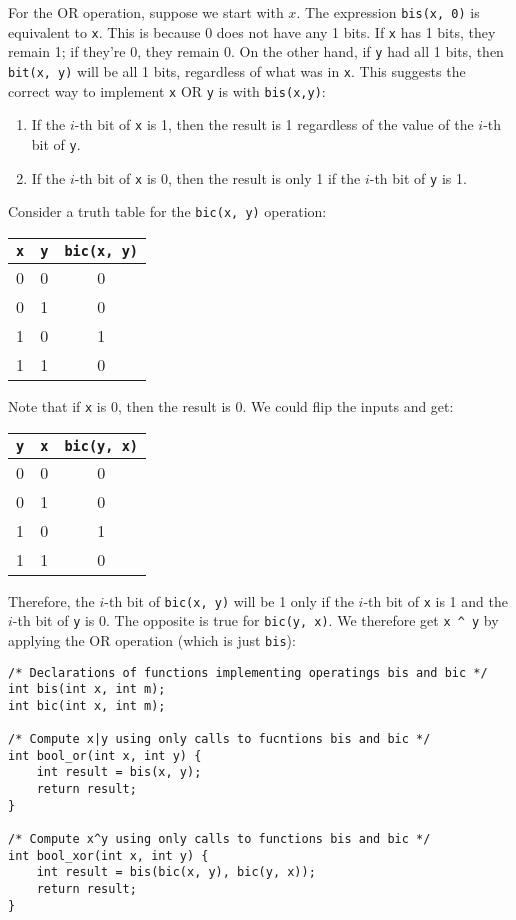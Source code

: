 \documentclass[12pt]{article}
\newenvironment{sol}[1][Solution]{\begin{trivlist}
		\item[\hskip \labelsep {\bfseries #1:}]}{\end{trivlist}}
\begin{document}
\begin{sol}
	For the OR operation, suppose we start with $x$. The expression \texttt{bis(x, 0)} is
	equivalent to \texttt{x}. This is because 0 does not have any 1 bits. If \texttt{x} has
	1 bits, they remain 1; if they're 0, they remain 0. On the other hand, if
	\texttt{y} had all 1 bits, then \texttt{bit(x, y)} will be all 1 bits, regardless of what
	was in \texttt{x}. This suggests the correct way to implement \texttt{x} OR \texttt{y}
	is with \texttt{bis(x,y)}:
	\begin{enumerate}
		\item If the $i$-th bit of \texttt{x} is 1, then the result is 1 regardless
		of the value of the $i$-th bit of \texttt{y}.
		\item  If the $i$-th bit of \texttt{x} is 0, then the result is only 1 if the
		$i$-th bit of \texttt{y} is 1.
	\end{enumerate}
	Consider a truth table for the \texttt{bic(x, y)} operation:
	\begin{center}
		\begin{tabular}{cc|c}
			\texttt{x} & \texttt{y} & \texttt{bic(x, y)}\\
			\hline
			0 & 0 & 0 \\
			0 & 1 & 0 \\
			1 & 0 & 1 \\
			1 & 1 & 0 
		\end{tabular}
	\end{center}
	Note that if \texttt{x} is 0, then the result is 0. We could flip the inputs and get:
	\begin{center}
		\begin{tabular}{cc|c}
			\texttt{y} & \texttt{x} & \texttt{bic(y, x)}\\
			\hline
			0 & 0 & 0 \\
			0 & 1 & 0 \\
			1 & 0 & 1 \\
			1 & 1 & 0 
		\end{tabular}
	\end{center}
	Therefore, the $i$-th bit of \texttt{bic(x, y)} will be 1 only if the
	$i$-th bit of \texttt{x} is 1 and the $i$-th bit of \texttt{y} is 0.
	The opposite is true for \texttt{bic(y, x)}. We therefore get \texttt{x \^{} y}
	by applying the OR operation (which is just \texttt{bis}):
	\begin{lstlisting}
/* Declarations of functions implementing operatings bis and bic */
int bis(int x, int m);
int bic(int x, int m);

/* Compute x|y using only calls to fucntions bis and bic */
int bool_or(int x, int y) {
	int result = bis(x, y);
	return result;
}

/* Compute x^y using only calls to functions bis and bic */
int bool_xor(int x, int y) {
	int result = bis(bic(x, y), bic(y, x));
	return result;
}
	\end{lstlisting}
\end{sol}
\end{document}
